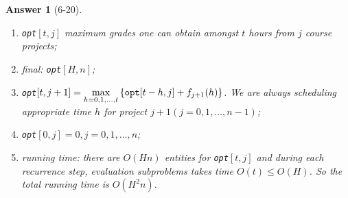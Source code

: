 \documentclass[11pt]{article}
\theoremstyle{numberplain}
\theoremstyle{nonumberplain}
\newtheorem{ans}{Answer}
\newcommand{\dps}{\displaystyle}
\newcommand{\0}{{\mathbf{0}}}
\begin{document}
\begin{ans}[6-20]
\begin{enumerate}
\item {\tt opt}$[t,j]$ maximum grades one can obtain amongst $t$ hours from $j$ course projects;
\item final: {\tt opt}$[H,n]$;
\item {\tt opt}$\dps [t,j+1]=\max_{h=0,1,\ldots, t}\left\{ {\tt opt}[t-h,j]+f_{j+1}(h) \right\}$. We are always scheduling appropriate time $ h$ for project $j+1 (j=0,1,\ldots,n-1)$;
\item {\tt opt}$[0,j]=0,j=0,1,\ldots,n$;
\item running time: there are $O(Hn)$ entities for {\tt opt}$[t,j]$ and during each recurrence step, evaluation subproblems takes time $O(t)\leq O(H)$. So the total running time is $O(H^2n)$.
\end{enumerate}
\end{ans}
\end{document}
